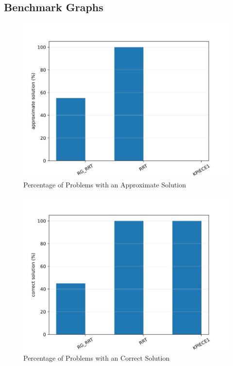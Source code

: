 \documentclass[conference]{IEEEtran}
\begin{document}
\subsection{Benchmark Graphs}
\begin{figure}[htp]
\centering
\includegraphics[scale=0.5]{combatBenchmarking/0.jpg}
\caption{Percentage of Problems with an Approximate Solution}
\label{Percentage of Problems with an Approximate Solution}
\end{figure}


\begin{figure}[htp]
\centering
\includegraphics[scale=0.5]{combatBenchmarking/1.jpg}
\caption{Percentage of Problems with an Correct Solution}
\label{Percentage of Problems with an Correct Solution}
\end{figure}
\end{document}

